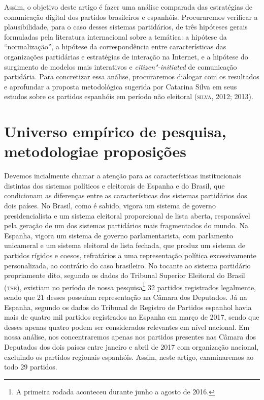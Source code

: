 Assim, o objetivo deste artigo é fazer uma análise comparada das
estratégias de comunicação digital dos partidos brasileiros e espanhóis.
Procuraremos verificar a plausibilidade, para o caso desses sistemas
partidários, de três hipóteses gerais formuladas pela literatura
internacional sobre a temática: a hipótese da ``normalização'', a
hipótese da correspondência entre características das organizações
partidárias e estratégias de interação na Internet, e a hipótese do
surgimento de modelos mais interativos e \textit{citizen"-initiated} de
comunicação partidária. Para concretizar essa análise, procuraremos
dialogar com os resultados e aprofundar a proposta metodológica sugerida
por Catarina Silva em seus estudos sobre os partidos espanhóis em
período não eleitoral (\textsc{silva}, 2012; 2013).

\section{Universo empírico de pesquisa, metodologia\break e proposições}

Devemos incialmente chamar a atenção para as características
institucionais distintas dos sistemas políticos e eleitorais de Espanha
e do Brasil, que condicionam as diferenças entre as características dos
sistemas partidários dos dois países. No Brasil, como é sabido, vigora
um sistema de governo presidencialista e um sistema eleitoral
proporcional de lista aberta, responsável pela geração de um dos
sistemas partidários mais fragmentados do mundo. Na Espanha, vigora um
sistema de governo parlamentarista, com parlamento unicameral e um
sistema eleitoral de lista fechada, que produz um sistema de partidos
rígidos e coesos, refratários a uma representação política
excessivamente personalizada, ao contrário do caso brasileiro. No
tocante ao sistema partidário propriamente dito, segundo os dados do
Tribunal Superior Eleitoral do Brasil (\textsc{tse}), existiam no período de
nossa pesquisa\footnote{A primeira rodada aconteceu durante junho a agosto de 2016.} 32 partidos
registrados legalmente, sendo que 21 desses possuíam representação na
Câmara dos Deputados. Já na Espanha, segundo os dados do Tribunal de
Registro de Partidos espanhol havia mais de quatro mil partidos
registrados na Espanha em março de 2017, sendo que desses apenas quatro podem ser
considerados relevantes em nível nacional.
Em nossa análise, nos
concentraremos apenas nos partidos presentes nas Câmara dos Deputados
dos dois países entre janeiro e abril de 2017 com organização nacional,
excluindo os partidos regionais espanhóis. Assim, neste artigo,
examinaremos ao todo 29 partidos.

